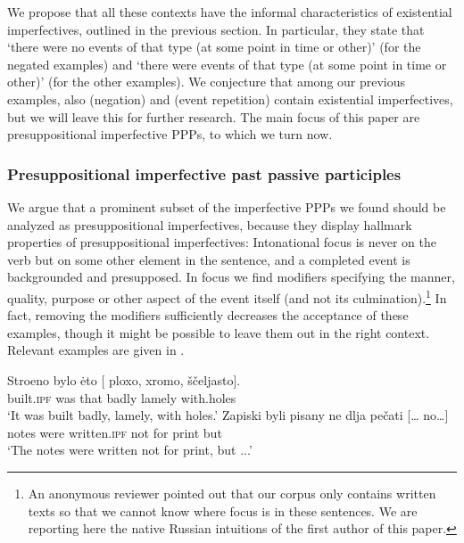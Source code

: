 \documentclass[output=paper,modfonts,newtxmath,hidelinks
]{langscibook}
\begin{document}
\noindent We propose that all these contexts have the informal characteristics of existential imperfectives, outlined in the previous section. In particular, they state that `there were no events of that type (at some point in time or other)' (for the negated examples) and `there were events of that type (at some point in time or other)' (for the other examples). We conjecture that among our previous examples, also  (negation) and  (event repetition) contain existential imperfectives, but we will leave this for further research. The main focus of this paper are presuppositional imperfective PPPs, to which we turn now.

\subsubsection{Presuppositional imperfective past passive participles}

We argue that a prominent subset of the imperfective PPPs we found should be analyzed as presuppositional imperfectives, because they display hallmark properties of presuppositional imperfectives: Intonational focus is never on the verb but on some other element in the sentence, and a completed event is backgrounded and presupposed. In focus we find modifiers specifying the manner, quality, purpose or other aspect of the event itself (and not its culmination).\footnote{An anonymous reviewer pointed out that our corpus only contains written texts so that we cannot know where focus is in these sentences. We are reporting here the native Russian intuitions of the first author of this paper.} In fact, removing the modifiers sufficiently decreases the acceptance of these examples, though it might be possible to leave them out in the right context. Relevant examples are given in .  

\ea\label{stroeno}
\ea\gll 	Stroeno bylo \.{e}to [\hspace{-2pt} ploxo, xromo, ščeljasto].\\
	built.\textsc{ipf} was that {} badly lamely with.holes\\
\glt	`It was built badly, lamely, with holes.' \label{stroenoa}
\ex\gll 	Zapiski byli pisany ne dlja pečati [{\dots} no\dots]\\	
	notes were written.\textsc{ipf} not for print {} but {}\\
\glt	`The notes were written not for print, but ...' \label{zapiski}
\z\z
\end{document}
